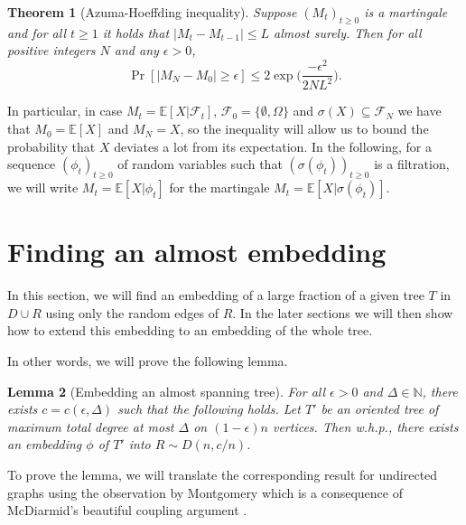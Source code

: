 \documentclass[10pt, a4paper]{article}
\newtheorem{theorem}{Theorem}
\newtheorem{lemma}[theorem]{Lemma}
\theoremstyle{remark}
\newcommand*{\E}{\ensuremath{\mathbb{E}}}
\begin{document}
 \begin{theorem}[Azuma-Hoeffding inequality]\cite{azuma, hoeffding}\label{thm:azuma}
        Suppose $(M_t)_{t\geq 0}$ is a martingale and for all $t\geq 1$ it holds that $|M_t - M_{t-1}| \leq L$ almost surely.
        Then for all positive integers $N$ and any $\epsilon > 0$,
        \[ \Pr[|M_N - M_0| \geq \epsilon] \leq 2\exp \Bigg(\frac{-\epsilon^2}{2NL^2} \Bigg). \]
\end{theorem}

In particular, in case $M_t = \E[X | \mathcal{F}_t]$, $\mathcal{F}_0 = \{ \emptyset, \Omega \}$ and $\sigma(X) \subseteq \mathcal{F}_N$ we have that $M_0 = \E[X]$ and $M_N = X$, so the inequality will allow us to bound the probability that $X$ deviates a lot from its expectation.
In the following, for a sequence $(\phi_t)_{t\geq 0}$ of random variables such that $(\sigma(\phi_t))_{t\geq 0}$ is a filtration, we will write $M_t = \E[X | \phi_t]$ for the martingale $M_t = \E[X | \sigma(\phi_t)]$.

\section{Finding an almost embedding}\label{section:almostembedding}

In this section, we will find an embedding of a large fraction of a given tree $T$ in $D \cup R$ using only the random edges of $R$.
In the later sections we will then show how to extend this embedding to an embedding of the whole tree. 

In other words, we will prove the following lemma.

\begin{lemma}[Embedding an almost spanning tree]\label{lemma:almostembedding}
    For all $\epsilon >0$ and $\Delta \in \mathbb{N}$, there exists $c = c(\epsilon, \Delta)$ such that the following holds.
    Let $T'$ be an oriented tree of maximum total degree at most $\Delta$ on $(1-\epsilon)n$ vertices.
    Then w.h.p., there exists an embedding $\phi$ of $T'$ into $R \sim D(n, c/n)$.
\end{lemma}

To prove the lemma, we will translate the corresponding result for undirected graphs \cite[Theorem 1.1]{alon_embedding_2007} using the observation by Montgomery \cite[Theorem 3.1]{montgomery_spanning_2021} which is a consequence of McDiarmid's beautiful coupling argument \cite{mcdiarmid_general_1983}.
\end{document}
